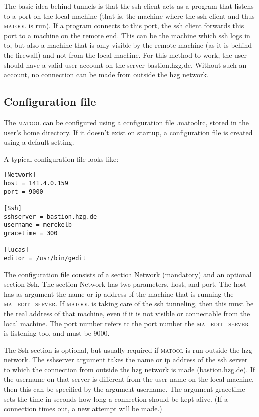 \documentclass{article}
\newcommand{\mtc}{\textsc{matool}}
\newcommand{\mts}{\textsc{ma\_edit\_server}}
\begin{document}
The basic idea behind tunnels is that the ssh-client acts as a program
that listens to a port on the local machine (that is, the machine
where the ssh-client and thus \mtc{} is run). If a program connects to
this port, the ssh client forwards this port to a machine on the
remote end. This can be the machine which ssh logs in to, but also a
machine that is only visible by the remote machine (as it is behind
the firewall) and not from the local machine. For this method to work,
the user should have a valid user account on the server
bastion.hzg.de. Without such an account, no connection can be made
from outside the hzg network.

\subsection{Configuration file}
The \mtc{} can be configured using a configuration file .matoolrc,
stored in the user's home directory. If it doesn't exist on startup, a
configuration file is created using a default setting.

A typical configuration file looks like:
\begin{verbatim}
[Network]
host = 141.4.0.159
port = 9000

[Ssh]
sshserver = bastion.hzg.de
username = merckelb
gracetime = 300

[lucas]
editor = /usr/bin/gedit
\end{verbatim}

The configuration file consists of a section Network (mandatory) and
an optional section Ssh. The section Network has two parameters, host,
and port. The host has as argument the name or ip address of the
machine that is running the \mts{}. If \mtc{} is taking care
of the ssh tunneling, then this must be the real address of that
machine, even if it is not visible or connectable from the local
machine. The port number refers to the port number the \mts{} is
listening too, and must be 9000. 

The Ssh section is optional, but usually required if \mtc{} is run
outside the hzg network. The sshserver argument takes the name or ip
address of the ssh server to which the connection from outside the hzg
network is made (bastion.hzg.de). If the username on that server is
different from the user name on the local machine, then this can be
specified by the argument username. The argument gracetime sets the
time in seconds how long a connection should be kept alive. (If a
connection times out, a new attempt will be made.)
\end{document}
